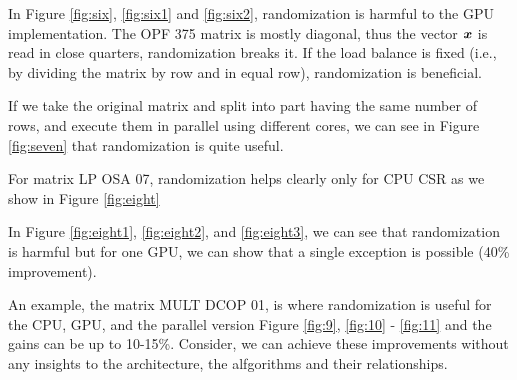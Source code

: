 \documentclass[manuscript,screen]{acmart}
\begin{document}
In Figure \ref{fig:six}, \ref{fig:six1} and \ref{fig:six2},
randomization is harmful to the GPU implementation. The OPF 375 matrix
is mostly diagonal, thus the vector ${\boldsymbol x}$ is read in close
quarters, randomization breaks it.  If the load balance is fixed
(i.e., by dividing the matrix by row and in equal row), randomization
is beneficial.


If we take the original matrix and split into part having the same
number of rows, and execute them in parallel using different cores, we
can see in Figure \ref{fig:seven} that randomization is quite useful.


For matrix LP OSA 07, randomization helps clearly only for CPU CSR as
we show in Figure \ref{fig:eight}


In Figure \ref{fig:eight1}, \ref{fig:eight2}, and \ref{fig:eight3}, we
can see that randomization is harmful but for one GPU, we can show
that a single exception is possible (40\% improvement).




An example, the matrix MULT DCOP 01, is where randomization is useful
for the CPU, GPU, and the parallel version Figure \ref{fig:9},
\ref{fig:10} - \ref{fig:11} and the gains can be up to
10-15\%. Consider, we can achieve these improvements without any
insights to the architecture, the alfgorithms and their relationships.
\end{document}
